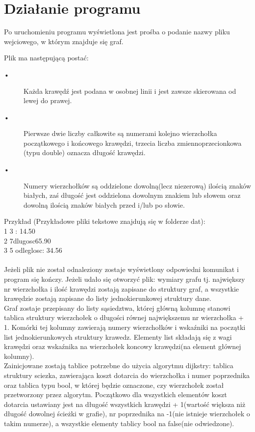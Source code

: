 \documentclass[12pt,a4paper]{article}
\begin{document}
\section{Działanie programu}
Po uruchomieniu programu wyświetlona jest prośba o podanie nazwy pliku wejciowego, w którym znajduje się graf. 

Plik ma następującą postać: 

\begin{description}
  \item[•] Każda krawędź jest podana w osobnej linii i jest zawsze skierowana od lewej do prawej. 
 \item[•] Pierwsze dwie liczby całkowite są numerami kolejno wierzchołka początkowego i końcowego krawędzi, trzecia liczba zmiennoprzecionkowa (typu double) oznacza długość krawędzi.
 \item[•]Numery wierzchołków są oddzielone dowolną(lecz niezerową) ilością znaków białych, zaś długość jest oddzielona dowolnym znakiem lub słowem oraz dowolną ilością znaków białych przed i/lub po słowie. 
\end{description}

Przykład (Przykładowe pliki tekstowe znajdują się w folderze dat): \\
1  3 :  14.50\\
2	7dlugosc65.90\\
3 5 odleglosc:	34.56\\ \\

Jeżeli plik nie został odnaleziony zostaje wyświetlony odpowiedni komunikat i program się kończy. Jeżeli udało się otworzyć plik: wymiary grafu tj. największy nr wierzchołka i ilość krawędzi zostają zapisane do struktury graf, a wszystkie krawędzie zostają zapisane do listy jednokierunkowej struktury dane. \\

Graf zostaje przepisany do listy sąsiedztwa, której główną kolumnę stanowi tablica struktury wierzchołek o długości równej największemu nr wierzchołka + 1. Komórki tej kolumny zawierają numery wierzchołków i wskaźniki na początki list jednokierunkowych struktury krawedz. Elementy list składają się z wagi krawędzi oraz wskaźnika na wierzchołek koncowy krawędzi(na element głównej kolumny).\\ 

Zainicjowane zostają tablice potrzebne do użycia algorytmu dijkstry: tablica struktury sciezka, zawierająca koszt dotarcia do wierzchołka i numer poprzednika oraz tablica typu bool, w której będzie oznaczone, czy wierzchołek został przetworzony przez algorytm. Początkowo dla wszystkich elementów koszt dotarcia ustawiany jest na długość wszystkich krawędzi + 1(wartość większa niż długość dowolnej ścieżki w grafie), nr poprzednika na -1(nie istnieje wierzchołek o takim numerze), a wszystkie elementy tablicy bool na false(nie odwiedzone).\\
\end{document}
